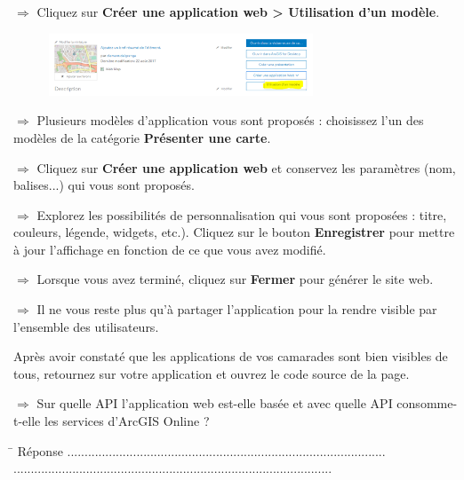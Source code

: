 \documentclass[11pt]{article}
\newcommand{\action}{$\Rightarrow$ }
\newcommand{\reponse}{
	\begin{tabbing}
	\hspace{2cm}\=\kill
	Réponse \> ............................................................................................ \\ 
 	\> ............................................................................................
	\end{tabbing}
}
\begin{document}
\action Cliquez sur \textbf{Créer une application web > Utilisation d'un modèle}.
\begin{figure}[H]
	\center \includegraphics[width=0.7\textwidth]{img/td1/ago_creer_appli_web.png} \\
\end{figure}

\action Plusieurs modèles d'application vous sont proposés : choisissez l'un des modèles de la catégorie \textbf{Présenter une carte}.

\action Cliquez sur \textbf{Créer une application web} et conservez les paramètres (nom, balises...) qui vous sont proposés.

\action Explorez les possibilités de personnalisation qui vous sont proposées : titre, couleurs, légende, widgets, etc.). Cliquez sur le bouton \textbf{Enregistrer} pour mettre à jour l'affichage en fonction de ce que vous avez modifié.

\action Lorsque vous avez terminé, cliquez sur \textbf{Fermer} pour générer le site web. 

\action Il ne vous reste plus qu'à partager l'application pour la rendre visible par l'ensemble des utilisateurs.

Après avoir constaté que les applications de vos camarades sont bien visibles de tous, retournez sur votre application et ouvrez le code source de la page. 

\action Sur quelle API l'application web est-elle basée et avec quelle API consomme-t-elle les services d’ArcGIS Online ?

\reponse
\end{document}
